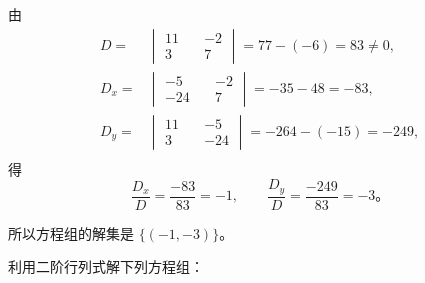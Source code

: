 由
\begin{align*}
    D ={} & \begin{vmatrix}
            11  \quad & -2 \\
            3   \quad & 7
        \end{vmatrix} = 77 - (-6) = 83 \neq 0, \\
    D_x ={} & \begin{vmatrix}
            -5  \quad & -2 \\
            -24 \quad & 7
        \end{vmatrix} = -35 - 48 = -83, \\
    D_y ={} & \begin{vmatrix}
            11  \quad & -5 \\
            3   \quad & -24
        \end{vmatrix} = -264 - (-15) = -249, \\
\end{align*}
得
$$ \dfrac{D_x}{D} = \dfrac{-83}{83} = -1, \qquad \dfrac{D_y}{D} = \dfrac{-249}{83} = -3 \text{。} $$

所以方程组的解集是 $\{(-1, -3)\}$。


\lianxi

利用二阶行列式解下列方程组：

\begin{xiaoxiaotis}


\end{xiaoxiaotis}


